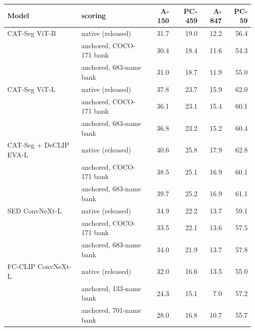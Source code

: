 \begin{tabular}{@{}llrrrr@{}}
\toprule
Model & scoring & A-150 & PC-459 & A-847 & PC-59 \\
\midrule
CAT-Seg ViT-B & native (released) & 31.7 & 19.0 & 12.2 & 56.4 \\
 & anchored, COCO-171 bank & 30.4 & 18.4 & 11.6 & 54.3 \\
 & anchored, 683-name bank & 31.0 & 18.7 & 11.9 & 55.0 \\
\midrule
CAT-Seg ViT-L & native (released) & 37.8 & 23.7 & 15.9 & 62.0 \\
 & anchored, COCO-171 bank & 36.1 & 23.1 & 15.4 & 60.1 \\
 & anchored, 683-name bank & 36.8 & 23.2 & 15.2 & 60.4 \\
\midrule
CAT-Seg + DeCLIP EVA-L & native (released) & 40.6 & 25.8 & 17.9 & 62.8 \\
 & anchored, COCO-171 bank & 38.5 & 25.1 & 16.9 & 60.1 \\
 & anchored, 683-name bank & 39.7 & 25.2 & 16.9 & 61.1 \\
\midrule
SED ConvNeXt-L & native (released) & 34.9 & 22.2 & 13.7 & 59.1 \\
 & anchored, COCO-171 bank & 33.5 & 22.1 & 13.6 & 57.5 \\
 & anchored, 683-name bank & 34.0 & 21.9 & 13.7 & 57.8 \\
\midrule
FC-CLIP ConvNeXt-L & native (released) & 32.0 & 16.6 & 13.5 & 55.0 \\
 & anchored, 133-name bank & 24.3 & 15.1 & 7.0 & 57.2 \\
 & anchored, 701-name bank & 28.0 & 16.8 & 10.7 & 55.7 \\
\bottomrule
\end{tabular}
